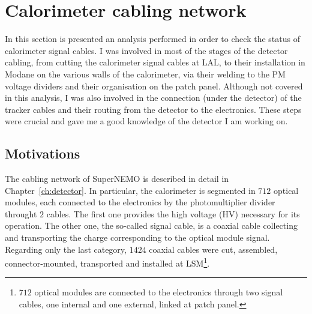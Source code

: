 \section{Calorimeter cabling network}
\label{sec:reflecto}

In this section is presented an analysis performed in order to check the status of calorimeter signal cables.
I was involved in most of the stages of the detector cabling, from cutting the calorimeter signal cables at LAL, to their installation in Modane on the various walls of the calorimeter, via their welding to the PM voltage dividers and their organisation on the patch panel.
Although not covered in this analysis, I was also involved in the connection (under the detector) of the tracker cables and their routing from the detector to the electronics.
These steps were crucial and gave me a good knowledge of the detector I am working on.

\subsection{Motivations}

The cabling network of SuperNEMO is described in detail in Chapter~\ref{ch:detector}.
In particular, the calorimeter is segmented in $712$ optical modules, each connected to the electronics by the photomultiplier divider throught $2$ cables.
The first one provides the high voltage (HV) necessary for its operation.
The other one, the so-called signal cable, is a coaxial cable collecting and transporting the charge corresponding to the optical module signal.
Regarding only the last category, $1424$ coaxial cables were cut, assembled, connector-mounted, transported and installed at LSM\footnote{$712$ optical modules are connected to the electronics through two signal cables, one internal and one external, linked at patch panel.}.


